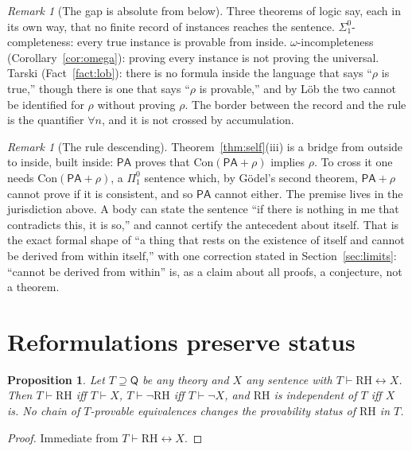 \documentclass[11pt]{article}
\newtheorem{proposition}[theorem]{Proposition}
\theoremstyle{definition}
\theoremstyle{remark}
\newtheorem{remark}[theorem]{Remark}
\newcommand{\PA}{\mathsf{PA}}
\newcommand{\RA}{\mathsf{Q}}
\newcommand{\Con}{\mathrm{Con}}
\newcommand{\RH}{\mathrm{RH}}
\newcommand{\Pione}{\Pi^0_1}
\newcommand{\Sigone}{\Sigma^0_1}
\begin{document}
\begin{remark}[The gap is absolute from below]
Three theorems of logic say, each in its own way, that no finite record of instances reaches the sentence. $\Sigone$-completeness: every true instance is provable from inside. $\omega$-incompleteness (Corollary~\ref{cor:omega}): proving every instance is not proving the universal. Tarski (Fact~\ref{fact:lob}): there is no formula inside the language that says ``$\rho$ is true,'' though there is one that says ``$\rho$ is provable,'' and by L\"ob the two cannot be identified for $\rho$ without proving $\rho$. The border between the record and the rule is the quantifier $\forall n$, and it is not crossed by accumulation.
\end{remark}

\begin{remark}[The rule descending]
Theorem~\ref{thm:self}(iii) is a bridge from outside to inside, built inside: $\PA$ proves that $\Con(\PA+\rho)$ implies $\rho$. To cross it one needs $\Con(\PA+\rho)$, a $\Pione$ sentence which, by G\"odel's second theorem, $\PA+\rho$ cannot prove if it is consistent, and so $\PA$ cannot either. The premise lives in the jurisdiction above. A body can state the sentence ``if there is nothing in me that contradicts this, it is so,'' and cannot certify the antecedent about itself. That is the exact formal shape of ``a thing that rests on the existence of itself and cannot be derived from within itself,'' with one correction stated in Section~\ref{sec:limits}: ``cannot be derived from within'' is, as a claim about all proofs, a conjecture, not a theorem.
\end{remark}

\section{Reformulations preserve status}\label{sec:status}

\begin{proposition}\label{prop:status}
Let $T\supseteq\RA$ be any theory and $X$ any sentence with $T\vdash\RH\leftrightarrow X$. Then $T\vdash\RH$ iff $T\vdash X$, $T\vdash\neg\RH$ iff $T\vdash\neg X$, and $\RH$ is independent of $T$ iff $X$ is. No chain of $T$-provable equivalences changes the provability status of $\RH$ in $T$.
\end{proposition}

\begin{proof}
Immediate from $T\vdash\RH\leftrightarrow X$.
\end{proof}
\end{document}
